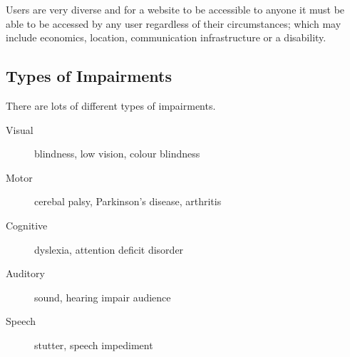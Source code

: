 Users are very diverse and for a website to be accessible to anyone it must be able to be accessed by any user regardless of their circumstances; which may include economics, location, communication infrastructure or a disability.

\subsection{Types of Impairments}
There are lots of different types of impairments.
\begin{description}
    \item[Visual] blindness, low vision, colour blindness
    \item[Motor] cerebal palsy, Parkinson's disease, arthritis
    \item[Cognitive] dyslexia, attention deficit disorder
    \item[Auditory] sound, hearing impair audience
    \item[Speech] stutter, speech impediment
\end{description}